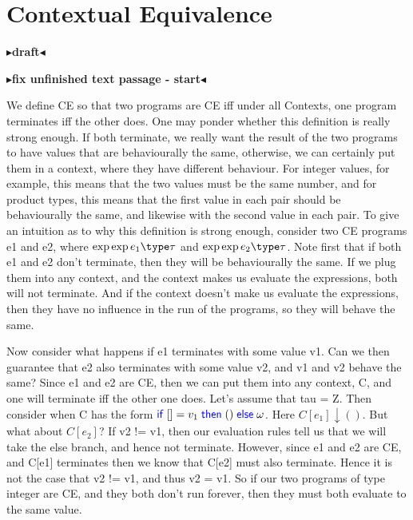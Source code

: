 \documentclass[twoside,11pt,openright]{report}
\newcommand{\Keyword}[1]{{\color{blue} \mathsf{#1}}}
\newcommand{\expr}{e}
\newcommand{\val}{v}
\newcommand{\TT}{()}
\newcommand{\IfCmd}{\Keyword{if}}
\newcommand{\ThenCmd}{\Keyword{then}}
\newcommand{\ElseCmd}{\Keyword{else}}
\def\If#1then#2else#3{\IfCmd{}\;#1\;\ThenCmd{}\;#2\;\ElseCmd{}\;#3}
\newcommand{\typ}{\tau}
\def\envs#1#2\exp#3\type#4{#1 \; | \; #2 \; \vdash #3 : #4}
\newcommand{\todo}[1]{{\color[rgb]{.5,0,0}\textbf{$\blacktriangleright$#1$\blacktriangleleft$}}}
\begin{document}





\chapter{Contextual Equivalence}
\label{ch:CE}

\todo{draft}




\todo{fix unfinished text passage - start}

We define CE so that two programs are CE iff under all Contexts,
one program terminates iff the other does.
One may ponder whether this definition is really strong enough.
If both terminate, we really want the result of the two programs to have
values that are behaviourally the same, otherwise, we can certainly 
put them in a context, where they have different behaviour.
For integer values, for example, this means that the two values
must be the same number, and for product types, this means that
the first value in each pair should be behaviourally the same, and
likewise with the second value in each pair.
To give an intuition as to  why this definition is strong enough, 
consider two CE programs e1 and e2, where $\envs \cdot \cdot \exp \expr_1 \type \typ$ and $\envs \cdot \cdot \exp \expr_2 \type \typ$.
Note first that if both e1 and e2 don't terminate, then they will be
behaviourally the same. If we plug them into any context, and the context
makes us evaluate the expressions, both will not terminate. And if the
context doesn't make us evaluate the expressions, then they have no
influence in the run of the programs, so they will behave the same.

Now consider what happens if e1 terminates with some value v1.
Can we then guarantee that e2 also terminates with some value v2,
and v1 and v2 behave the same?
Since e1 and e2 are CE, then we can put them into any context, C, and
one will terminate iff the other one does.
Let's assume that tau = Z. Then consider when
C has the form $\If [] = \val_1 then \TT else \omega$.
Here $C[\expr_1] \downarrow \TT$. But what about $C[\expr_2]$? If v2 != v1, then
our evaluation rules tell us that we will take the else branch, and
hence not terminate. However, since e1 and e2 are CE, and C[e1] terminates
then we know that C[e2] must also terminate. Hence it is not the case that
v2 != v1, and thus v2 = v1. So if our two programs of type integer are CE, and they both don't run forever, then they must both evaluate to the same value.
\end{document}
